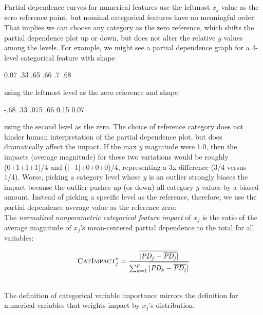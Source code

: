 \documentclass[11pt]{article}
\newcommand{\CImp}{\fontfamily{cmr}\textsc{CatImpact}}
\begin{document}
Partial dependence curves for numerical features use the leftmost $x_j$ value as the zero reference point, but nominal categorical features have no meaningful order. That implies we can choose any category as the zero reference, which shifts the partial dependence plot up or down, but does not alter the relative $y$ values among the levels. For example, we might see a partial dependence graph for a 4-level categorical feature with shape \begin{sparkline}{2.5}
 0.07
\sparkspike .33 .65
\sparkspike .66 .7
 .68
\end{sparkline} using the leftmost level as the zero reference and shape \begin{sparkline}{2.5}
 -.68
\sparkspike .33 .075
\sparkspike .66 0.15
 0.07
\end{sparkline} using the second level as the zero. The choice of reference category does not hinder human interpretation of the partial dependence plot, but does dramatically affect the impact.  If the max $y$  magnitude were 1.0, then the impacts (average magnitude) for these two variations would be roughly (0+1+1+1)/4 and ($|-1|$+0+0+0)/4, representing a 3x difference (3/4 versus 1/4). Worse, picking a category level whose $y$ is an outlier strongly biases the impact because the outlier pushes up (or down) all category $y$ values by a biased amount.  Instead of picking a specific level as the reference, therefore, we use the partial dependence average value as the reference zero:\\

 The {\em normalized nonparametric categorical feature impact} of $x_j$ is the ratio of the average magnitude of $x_j$'s mean-centered partial dependence to the total for all variables:

\begin{equation}\label{eq:Cpd4a}
\CImp_j^{*} = \frac{\overline{|\text{\it PD}_j - \overline{\text{\it PD}_j}|}}{\sum_{k=1}^p \overline{|\text{\it PD}_k - \overline{\text{\it PD}_j}|}}
\end{equation}

~\\

\noindent The definition of categorical variable importance mirrors the definition for numerical variables that weights impact by $x_j$'s distribution:

~\\
\end{document}
